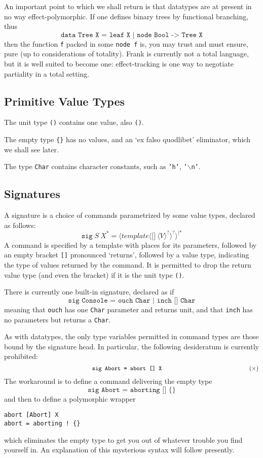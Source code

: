 \documentclass{article}
\begin{document}
An important point to which we shall return is that datatypes are at present in no way effect-polymorphic. If one defines binary trees by functional branching,
thus
\[
  \texttt{data Tree X  =  leaf X  |  node {Bool -> Tree X}}
\]
then the function \texttt{f} packed in some \texttt{node f} is, you may trust and must ensure, pure (up to considerations of totality). Frank is currently not a total language, but it is well suited to become one:
effect-tracking is one way to negotiate partiality in a total setting.


\subsection{Primitive Value Types}

The unit type \texttt{()} contains one value, also \texttt{()}.

The empty type \texttt{\{\}} has no values, and an `ex falso quodlibet' eliminator, which we shall see later.

The type \texttt{Char} contains character constants, such as \texttt{'h'}, \texttt{'\(\backslash\)n'}.


\subsection{Signatures}

A signature is a choice of commands parametrized by some value types,
declared as follows:
\[
  \texttt{sig}\;S\:X^\ast\;\texttt{=}\;\langle\mathit{template} \langle\texttt{[]}\:\langle V\rangle^? \rangle^?\rangle^{|\ast}
\]
A command is specified by a template with places for its parameters, followed by an empty bracket \texttt{[]} pronounced `returns', followed by
a value type, indicating the type of values returned by the command. It is
permitted to drop the return value type (and even the bracket) if it is the unit type \texttt{()}.

There is currently one built-in signature, declared as if
\[
  \texttt{sig Console  =  ouch Char  |  inch [] Char}
\]
meaning that \texttt{ouch} has one \texttt{Char} parameter and returns unit, and that \texttt{inch} has no parameters but returns a \texttt{Char}.

As with datatypes, the only type variables permitted in command types are those bound by the signature head. In particular, the following desideratum is currently prohibited:
\[
\hspace*{2in}\texttt{sig Abort  =  abort [] X}\hspace*{2in}\hfill (\times)
\]
The workaround is to define a command delivering the empty type
\[
\texttt{sig Abort  =  aborting [] \{\}}
\]
and then to define a polymorphic wrapper
\begin{verbatim}
abort [Abort] X
abort = aborting ! {}
\end{verbatim}
which eliminates the empty type to get you out of whatever trouble you find yourself in. An explanation of this mysterious syntax will follow
presently.
\end{document}
